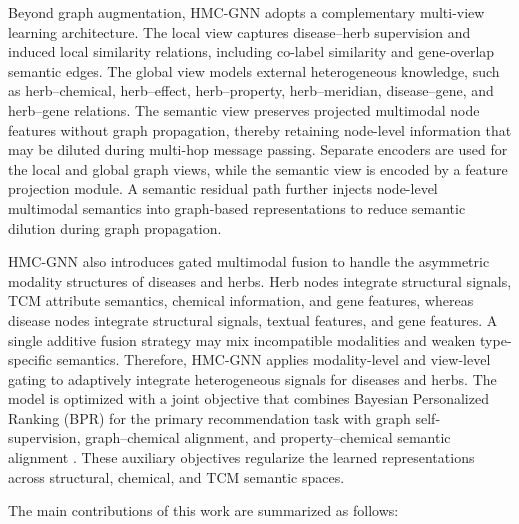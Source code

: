 \documentclass[journal,twoside,web]{ieeecolor}
\begin{document}
Beyond graph augmentation, HMC-GNN adopts a complementary multi-view learning architecture. The local view captures disease--herb supervision and induced local similarity relations, including co-label similarity and gene-overlap semantic edges. The global view models external heterogeneous knowledge, such as herb--chemical, herb--effect, herb--property, herb--meridian, disease--gene, and herb--gene relations. The semantic view preserves projected multimodal node features without graph propagation, thereby retaining node-level information that may be diluted during multi-hop message passing. Separate encoders are used for the local and global graph views, while the semantic view is encoded by a feature projection module. A semantic residual path further injects node-level multimodal semantics into graph-based representations to reduce semantic dilution during graph propagation.

HMC-GNN also introduces gated multimodal fusion to handle the asymmetric modality structures of diseases and herbs. Herb nodes integrate structural signals, TCM attribute semantics, chemical information, and gene features, whereas disease nodes integrate structural signals, textual features, and gene features. A single additive fusion strategy may mix incompatible modalities and weaken type-specific semantics. Therefore, HMC-GNN applies modality-level and view-level gating to adaptively integrate heterogeneous signals for diseases and herbs. The model is optimized with a joint objective that combines Bayesian Personalized Ranking (BPR) for the primary recommendation task with graph self-supervision, graph--chemical alignment, and property--chemical semantic alignment \cite{ref51,ref52}. These auxiliary objectives regularize the learned representations across structural, chemical, and TCM semantic spaces.

The main contributions of this work are summarized as follows:
\end{document}
